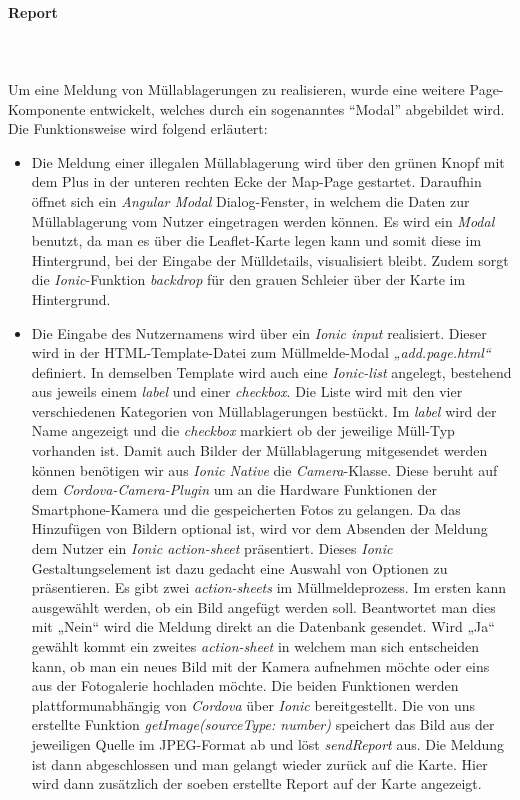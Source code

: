\documentclass[a4paper, 11pt, DIV=11, listof=numbered, numbers=noenddot]{scrartcl}
\begin{document}
	\paragraph{Report}
	\textbf{}\\
	\textbf{}\\
	Um eine Meldung von Müllablagerungen zu realisieren, wurde eine weitere Page-Komponente entwickelt, welches durch ein sogenanntes \enquote{Modal} abgebildet wird.
	Die Funktionsweise wird folgend erläutert:
	\begin {itemize}
		\item Die Meldung einer illegalen Müllablagerung wird über den grünen Knopf mit dem Plus in der unteren rechten Ecke der Map-Page gestartet. Daraufhin öffnet sich ein \textit{Angular Modal} Dialog-Fenster, in welchem die Daten zur Müllablagerung vom Nutzer eingetragen 					werden können. Es wird ein \textit{Modal} benutzt, da man es über die Leaflet-Karte legen kann und somit diese im Hintergrund, bei der Eingabe der Mülldetails, visualisiert bleibt. Zudem sorgt die \textit{Ionic}-Funktion \textit{backdrop} für den grauen 					Schleier über der Karte im Hintergrund.
		\item Die Eingabe des Nutzernamens wird über ein \textit{Ionic input} realisiert. Dieser wird in der HTML-Template-Datei zum Müllmelde-Modal \textit{„add.page.html“} definiert. In demselben Template wird auch eine \textit{Ionic-list} angelegt, bestehend aus jeweils 				einem \textit{label} und einer \textit{checkbox}. Die Liste wird mit den vier verschiedenen Kategorien von Müllablagerungen bestückt. Im \textit{label} wird der Name angezeigt und die \textit{checkbox} markiert ob der jeweilige Müll-Typ vorhanden ist.
			Damit auch Bilder der Müllablagerung mitgesendet werden können benötigen wir aus\textit{ Ionic Native} die \textit{Camera}-Klasse. Diese beruht auf dem \textit{Cordova-Camera-Plugin} um an die Hardware Funktionen der Smartphone-Kamera und die 				gespeicherten Fotos zu gelangen. Da das Hinzufügen von Bildern optional ist, wird vor dem Absenden der Meldung dem Nutzer ein \textit{Ionic action-sheet} präsentiert. Dieses \textit{Ionic} Gestaltungselement ist dazu gedacht eine Auswahl von Optionen zu 				präsentieren. Es gibt zwei \textit{action-sheets} im Müllmeldeprozess. Im ersten kann ausgewählt werden, ob ein Bild angefügt werden soll. Beantwortet man dies mit „Nein“ wird die Meldung direkt an die Datenbank gesendet. Wird „Ja“ gewählt kommt ein 				zweites \textit{action-sheet} in welchem man sich entscheiden kann, ob man ein neues Bild mit der Kamera aufnehmen möchte oder eins aus der Fotogalerie hochladen möchte. Die beiden Funktionen werden plattformunabhängig von \textit{Cordova} über 				\textit{Ionic} bereitgestellt. Die von uns erstellte Funktion \textit{getImage(sourceType: number)} speichert das Bild aus der jeweiligen Quelle im JPEG-Format ab und löst \textit{sendReport} aus. Die Meldung ist dann abgeschlossen und man gelangt wieder zurück auf die Karte. Hier wird dann zusätzlich der soeben erstellte Report auf der Karte angezeigt.
	\end{itemize}
\end{document}
